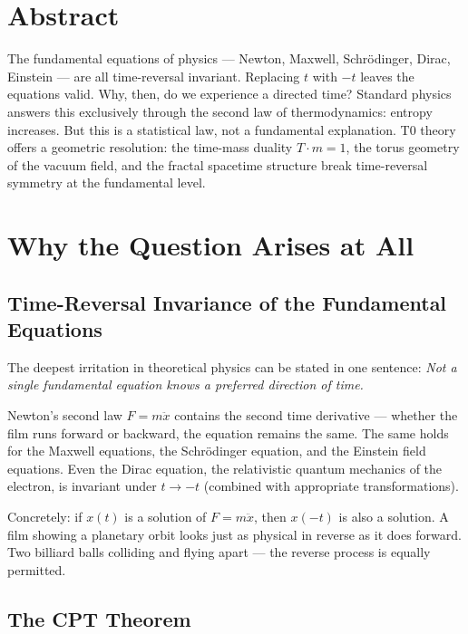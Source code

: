 
\section*{Abstract}
The fundamental equations of physics --- Newton, Maxwell, Schrödinger, Dirac, Einstein --- are all time-reversal invariant. Replacing $t$ with $-t$ leaves the equations valid. Why, then, do we experience a directed time? Standard physics answers this exclusively through the second law of thermodynamics: entropy increases. But this is a statistical law, not a fundamental explanation. T0 theory offers a geometric resolution: the time-mass duality $T \cdot m = 1$, the torus geometry of the vacuum field, and the fractal spacetime structure break time-reversal symmetry at the fundamental level.

\section{Why the Question Arises at All}

\subsection{Time-Reversal Invariance of the Fundamental Equations}

The deepest irritation in theoretical physics can be stated in one sentence: \emph{Not a single fundamental equation knows a preferred direction of time.}

Newton's second law $F = m\ddot{x}$ contains the second time derivative --- whether the film runs forward or backward, the equation remains the same. The same holds for the Maxwell equations, the Schrödinger equation, and the Einstein field equations. Even the Dirac equation, the relativistic quantum mechanics of the electron, is invariant under $t \to -t$ (combined with appropriate transformations).

Concretely: if $x(t)$ is a solution of $F = m\ddot{x}$, then $x(-t)$ is also a solution. A film showing a planetary orbit looks just as physical in reverse as it does forward. Two billiard balls colliding and flying apart --- the reverse process is equally permitted.

\subsection{The CPT Theorem}

